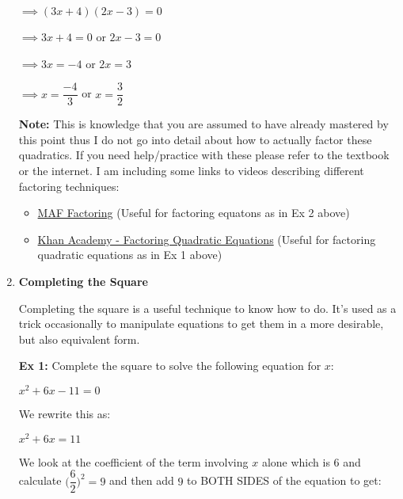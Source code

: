 \documentclass[12pt]{article}
\newenvironment{myindentpar}[1]%
     {\begin{list}{}%
             {\setlength{\leftmargin}{#1}}%
             \item[]%
     }
     {\end{list}}
\begin{document}
\begin{myindentpar}{1cm}
\begin{enumerate}
$\implies (3x + 4)(2x -3) = 0$

$\implies 3x + 4 = 0$ \hspace{1cm}  or \hspace{1cm}  $2x - 3 = 0$

$\implies 3x = -4$ \hspace{1.4cm}  or \hspace{1cm}  $2x  = 3$

$\implies x = \dfrac{-4}{3}$ \hspace{1.5cm}  or \hspace{1cm}  $x  = \dfrac{3}{2}$

\textbf{Note:} This is knowledge that you are assumed to have already mastered by this point thus I do not go into detail about how to actually factor these quadratics. If you need help/practice with these please refer to the textbook or the internet. I am including some links to videos describing different factoring techniques: 

\begin{itemize}
\item \href{https://www.youtube.com/watch?v=3cqzGf7fms8}{MAF Factoring} (Useful for factoring equatons as in Ex 2 above)

\item \href{https://www.khanacademy.org/math/algebra/multiplying-factoring-expression/factoring-quadratic-expressions/v/factoring-quadratic-expressions}{Khan Academy - Factoring Quadratic Equations} (Useful for factoring quadratic equations as in Ex 1 above)

\end{itemize}

\item \textbf{Completing the Square}

Completing the square is a useful technique to know how to do. It's used as a trick occasionally to manipulate equations to get them in a more desirable, but also equivalent form.

\textbf{Ex 1:} Complete the square to solve the following equation for $x$: 
\newline

\centerline{$x^2 + 6x - 11 = 0$}

We rewrite this as:

$x^2 + 6x = 11$

We look at the coefficient of the term involving $x$ alone which is $6$ and calculate $\Big(\dfrac{6}{2}\Big)^2 = 9$ and then add $9$ to BOTH SIDES of the equation to get:
\newline


\end{enumerate}
\end{myindentpar}
\end{document}
